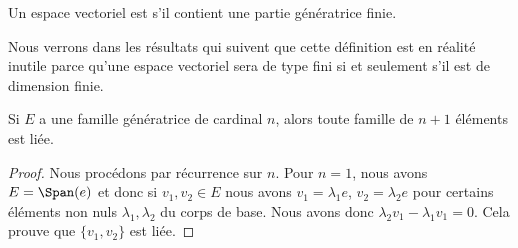 \begin{definition}
    Un espace vectoriel est  s'il contient une partie génératrice finie.
\end{definition}
Nous verrons dans les résultats qui suivent que cette définition est en réalité inutile parce qu'une espace vectoriel sera de type fini si et seulement s'il est de dimension finie.

\begin{lemma}       \label{LemytHnlD}
    Si \( E\) a une famille génératrice de cardinal \( n\), alors toute famille de \( n+1\) éléments est liée.
\end{lemma}

\begin{proof}
    Nous procédons par récurrence sur \( n\). Pour \( n=1\), nous avons \( E=\Span(e)\) et donc si \( v_1,v_2\in E\) nous avons \( v_1=\lambda_1 e\), \( v_2=\lambda_2e\) pour certains éléments non nuls \( \lambda_1,\lambda_2\) du corps de base. Nous avons donc \( \lambda_2v_1-\lambda_1v_1=0\). Cela prouve que \( \{ v_1,v_2 \}\) est liée.


\end{proof}

